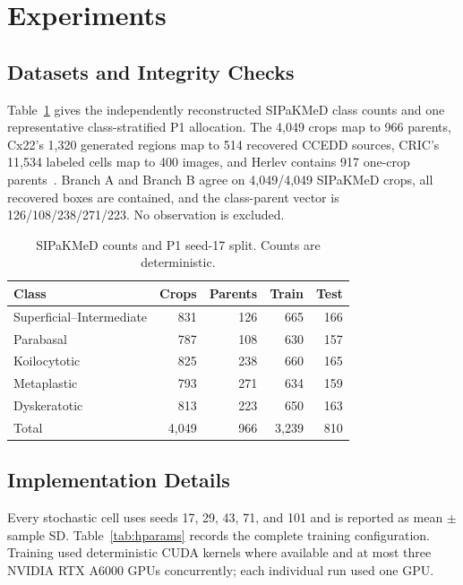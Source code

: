 \documentclass[conference]{IEEEtran}
\newcommand{\protocol}[1]{\textsf{#1}}
\begin{document}
\section{Experiments}
\subsection{Datasets and Integrity Checks}
Table~\ref{tab:classes} gives the independently reconstructed SIPaKMeD class counts and one representative class-stratified \protocol{P1} allocation.
The 4,049 crops map to 966 parents, Cx22's 1,320 generated regions map to 514 recovered CCEDD sources, CRIC's 11,534 labeled cells map to 400 images, and Herlev contains 917 one-crop parents~\cite{plissiti2018sipakmed,liu2022cx22,rezende2021cric,jantzen2005pap}.
Branch A and Branch B agree on 4,049/4,049 SIPaKMeD crops, all recovered boxes are contained, and the class-parent vector is 126/108/238/271/223.
No observation is excluded.

\begin{table}[t]
\caption{SIPaKMeD counts and \protocol{P1} seed-17 split. Counts are deterministic.}
\label{tab:classes}
\centering
\scriptsize
\setlength{\tabcolsep}{4.0pt}
\begin{tabular}{lrrrr}
\toprule
Class & Crops & Parents & Train & Test \\
\midrule
Superficial--Intermediate & 831 & 126 & 665 & 166 \\
Parabasal & 787 & 108 & 630 & 157 \\
Koilocytotic & 825 & 238 & 660 & 165 \\
Metaplastic & 793 & 271 & 634 & 159 \\
Dyskeratotic & 813 & 223 & 650 & 163 \\
\midrule
Total & 4,049 & 966 & 3,239 & 810 \\
\bottomrule
\end{tabular}
\end{table}

\subsection{Implementation Details}
Every stochastic cell uses seeds 17, 29, 43, 71, and 101 and is reported as mean $\pm$ sample SD.
Table~\ref{tab:hparams} records the complete training configuration.
Training used deterministic CUDA kernels where available and at most three NVIDIA RTX A6000 GPUs concurrently; each individual run used one GPU.
\end{document}
